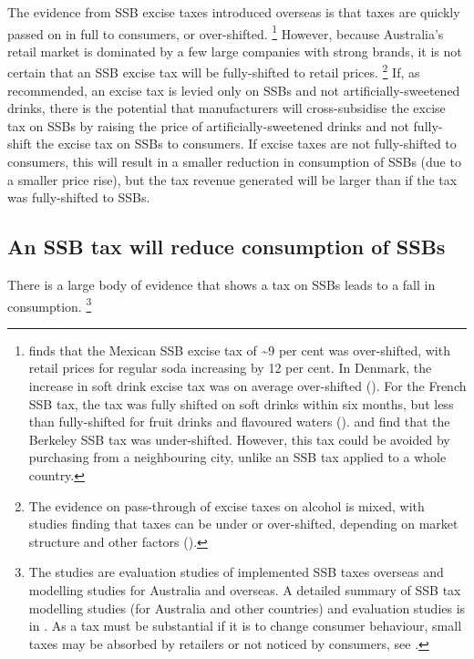 \documentclass[embargoed]{grattan}
\begin{document}
The evidence from SSB excise taxes introduced overseas is that taxes are quickly passed on in full to consumers, or over-shifted.%
\footnote{\textcite{Grogger2015Sodataxesprices} finds that the Mexican SSB excise tax of \textasciitilde{}9 per cent was over-shifted, with retail prices for regular soda increasing by 12 per cent.
In Denmark, the increase in soft drink excise tax was on average over-shifted (\textcite{Bergman2010Areexcisetaxes}).
For the French SSB tax, the tax was fully shifted on soft drinks within six months, but less than fully-shifted for fruit drinks and flavoured waters (\textcites{Berardi2016impactsodataxon}{Bonnet2013Taxincidencestrategic}). \textcite{Cawley2015IncidenceTaxesSugar} and \textcite{Falbe2015Higherretailprices} find that the Berkeley SSB tax was under-shifted.
However, this tax could be avoided by purchasing from a neighbouring city, unlike an SSB tax applied to a whole country.} However, because Australia's retail market is dominated by a few large companies with strong brands, it is not certain that an SSB excise tax will be fully-shifted to retail prices.%
\footnote{The evidence on pass-through of excise taxes on alcohol is mixed, with studies finding that taxes can be under or over-shifted, depending on market structure and other factors (\textcites{Cawley2015economyscalesselective}{DeCicca2013Whopayscigarette}{Dube2004Multiplediscretenessproduct}).} If, as recommended, an excise tax is levied only on SSBs and not artificially-sweetened drinks, there is the potential that manufacturers will cross-subsidise the excise tax on SSBs by raising the price of artificially-sweetened drinks and not fully-shift the excise tax on SSBs to consumers. If excise taxes are not fully-shifted to consumers, this will result in a smaller reduction in consumption of SSBs (due to a smaller price rise), but the tax revenue generated will be larger than if the tax was fully-shifted to SSBs.

\subsection{An SSB tax will reduce consumption of SSBs}\label{an-ssb-tax-will-reduce-consumption-of-ssbs}

There is a large body of evidence that shows a tax on SSBs leads to a fall in consumption.%
\footnote{The studies are evaluation studies of implemented SSB taxes overseas and modelling studies for Australia and overseas. A detailed summary of SSB tax modelling studies (for Australia and other countries) and evaluation studies is in . As a tax must be substantial if it is to change consumer behaviour, small taxes may be absorbed by retailers or not noticed by consumers, see \textcites{Thow2014systematicrevieweffectiveness}{Powell2013Assessingpotentialeffectiveness}{Mytton2012Taxingunhealthyfood}{Team2016Sugarlevyworking}{LordanShouldweput}{Organization2016FiscalPoliciesDiet}.}
\end{document}
